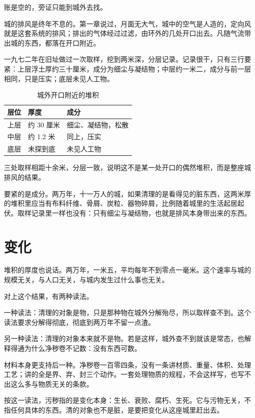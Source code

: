 账是空的，旁证只能到城外去找。

城的排风是终年不息的。第一章说过，月面无大气，城中的空气是人造的，定向风就是这套系统的排风；排出的气体经过过滤，由环外的几处开口出去。凡随气流带出城的东西，都落在开口附近。

一九七二年在旧址做过一次取样，挖到两米深，分层记录。记录很干，只有三行要紧：上层浮土厚约三十厘米，成分为细尘与凝结物；中层约一米二，成分与前一层相同，只是压实；底层未见人工物。

\begin{table}[htbp]
\centering
\caption{城外开口附近的堆积}
\begin{tabular}{@{}lll@{}}
\toprule
层位 & 厚度 & 成分\\
\midrule
上层 & 约 30 厘米 & 细尘、凝结物，松散 \\
中层 & 约 1.2 米 & 同上，压实 \\
底层 & 未探到底 & 未见人工物 \\
\bottomrule
\end{tabular}
\end{table}

三处取样相距十余米，分层一致，说明这不是某一处开口的偶然堆积，而是整座城排风的结果。

要紧的是成分。两万年，十一万人的城，如果清理的是看得见的脏东西，这两米厚的堆积里应当有布料纤维、骨屑、炭粒、器物碎屑，比例随着城里的生活起居起伏。取样记录里一样也没有：只有细尘与凝结物，也就是排风本身带出来的东西。

\section{变化}

堆积的厚度也说话。两万年，一米五，平均每年不到零点一毫米。这个速率与城的规模无关，与人口无关，与城内发生过什么事也无关。

对上这个结果，有两种读法。

一种读法：清理的对象是物，只是那种物在城外分解殆尽，所以取样查不到。这个读法要求分解得彻底，彻底到两万年不留一点渣。

另一种读法：清理的对象本来就不是物。若是这样，城外查不到就该是常态，也解释得通为什么净秽卷不记数：没有东西可数。

材料本身更支持后一种。净秽卷一百零四条，没有一条讲材质、重量、体积、处理工艺；讲的全是界、弃、封三个动作。一套处理物质的规程，不会这样写，也写不出这么多与物质无关的条款。

按这一读法，污秽指的是变化本身：生长、衰败、腐朽、生死。它与污物无关，不指任何具体的东西。清的对象也不是脏，是要把变化从这座城里赶出去。

